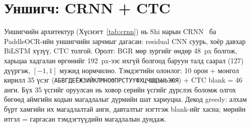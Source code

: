 \section{Уншигч: CRNN + CTC}
Уншигчийн архитектур (Хүснэгт~\ref{tab:crnn}) нь Shi нарын CRNN~\cite{shi2017crnn} ба PaddleOCR-ийн уншигчийн зарчмыг дагасан: residual CNN суурь, хоёр давхар BiLSTM хүзүү, CTC толгой. Оролт: BGR мөр зургийг өндөр 48~px болгож, харьцаа хадгалан өргөнийг 192~px-ээс ихгүй болгоод баруун талд саарал (127) дүүргэж, $[-1,1]$ мужид нормчилно. Тэмдэгтийн олонлог: 10 орон + монгол кирилл 35 үсэг (\texttt{АБВГДЕЁЖЗИЙКЛМНОӨПРСТУҮФХЦЧШЩЪЫЬЭЮЯ}) + CTC blank = 46 анги. Бүх 35 үсгийг оруулсан нь ховор серийн үсгийг дүрслэх боломж олгох бөгөөд аймгийн кодын магадлалыг дүрмийн шат хариуцна. Декод greedy: алхам бүрт хамгийн их магадлалтай анги, давталтыг нэгтгэж blank-ийг хасна; мөрийн итгэл = гаргасан тэмдэгтүүдийн магадлалын дундаж.
\begin{table}[H]\centering\caption{CRNN уншигчийн архитектур (оролт $3\times48\times192$, нийт 9.45 сая параметр)}\label{tab:crnn}\small
{}\end{table}

